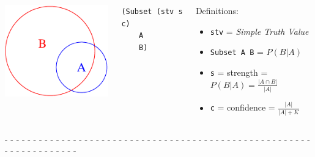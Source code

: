 \documentclass[aspectratio=169]{beamer}
\begin{document}
\begin{frame}
  



  \begin{columns}
    \column{1in}
    \includegraphics[scale=0.8]{images/subset_A_B.pdf}

    \column{2.7in}
\texttt{(Subset (stv s c)\\
\ \ \ \ A\\
\ \ \ \ B)}\\[0.22cm]

\begin{block}
  {Definitions:}
  {\begin{itemize}
    \item \texttt{stv} = \textit{Simple Truth Value}
    \item \texttt{Subset A B} = $P(B|A)$
    \item \texttt{s} = strength = $\displaystyle P(B|A)=\frac{|A \cap B|}{|A|}$
    \item \texttt{c} = confidence = $\displaystyle \frac{|A|}{|A| + K}$
    \end{itemize}}
\end{block}

  \end{columns}

  - - - - - - - - - - - - - - - - - - - - - - - - - - - - - - - - - -
  - - - - - - - - - - - - - - - - - - - - - - - - - - - - - - - - -\\[0.1cm]

\end{frame}
\end{document}

